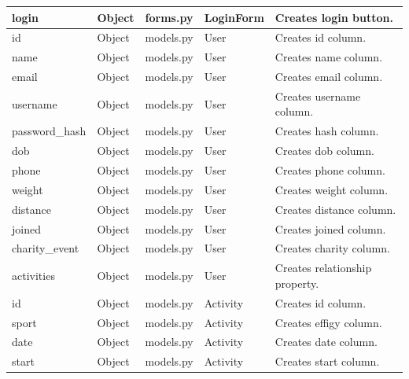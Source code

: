 \documentclass{article}[12pt,a4paper]
\begin{document}
\begin{longtable}{|l|l|l|l|l|}
login           & Object        & forms.py            & LoginForm               & Creates login button.       \\ \hline
id              & Object        & models.py           & User                    & Creates id column.          \\ \hline
name            & Object        & models.py           & User                    & Creates name column.        \\ \hline
email           & Object        & models.py           & User                    & Creates email column.       \\ \hline
username        & Object        & models.py           & User                    & Creates username column.    \\ \hline
password\_hash  & Object        & models.py           & User                    & Creates hash column.        \\ \hline
dob             & Object        & models.py           & User                    & Creates dob column.         \\ \hline
phone           & Object        & models.py           & User                    & Creates phone column.       \\ \hline
weight          & Object        & models.py           & User                    & Creates weight column.      \\ \hline
distance        & Object        & models.py           & User                    & Creates distance column.    \\ \hline
joined          & Object        & models.py           & User                    & Creates joined column.      \\ \hline
charity\_event  & Object        & models.py           & User                    & Creates charity column.     \\ \hline
activities      & Object        & models.py           & User                    & Creates relationship property.  \\ \hline
id              & Object        & models.py           & Activity                & Creates id column.          \\ \hline
sport           & Object        & models.py           & Activity                & Creates effigy column.      \\ \hline
date            & Object        & models.py           & Activity                & Creates date column.        \\ \hline
start           & Object        & models.py           & Activity                & Creates start column.       \\ \hline

\end{longtable}
\end{document}

